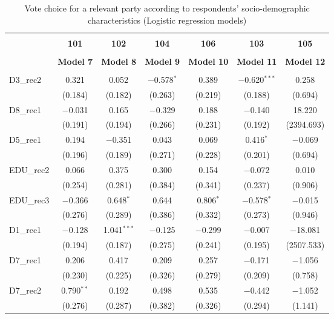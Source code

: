 \documentclass[
]{article}
\begin{document}
\begin{table}[!htbp] \centering 
  \caption{Vote choice for a relevant party according to respondents' 
                       socio-demographic characteristics (Logistic regression models)} 
  \label{table:full_logit_at} 
\begin{tabular}{@{\extracolsep{5pt}}lcccccc} 
\\[-1.8ex]\hline \\[-1.8ex] 
 & \textbf{101} & \textbf{102} & \textbf{104} & \textbf{106} & \textbf{103} & \textbf{105} \\ 
\\[-1.8ex] & \textbf{Model 7} & \textbf{Model 8} & \textbf{Model 9} & \textbf{Model 10} & \textbf{Model 11} & \textbf{Model 12}\\ 
\hline \\[-1.8ex] 
 D3\_rec2 & 0.321 & 0.052 & $-$0.578$^{*}$ & 0.389 & $-$0.620$^{***}$ & 0.258 \\ 
  & (0.184) & (0.182) & (0.263) & (0.219) & (0.188) & (0.694) \\ 
  D8\_rec1 & $-$0.031 & 0.165 & $-$0.329 & 0.188 & $-$0.140 & 18.220 \\ 
  & (0.191) & (0.194) & (0.266) & (0.231) & (0.192) & (2394.693) \\ 
  D5\_rec1 & 0.194 & $-$0.351 & 0.043 & 0.069 & 0.416$^{*}$ & $-$0.069 \\ 
  & (0.196) & (0.189) & (0.271) & (0.228) & (0.201) & (0.694) \\ 
  EDU\_rec2 & 0.066 & 0.375 & 0.300 & 0.154 & $-$0.072 & 0.010 \\ 
  & (0.254) & (0.281) & (0.384) & (0.341) & (0.237) & (0.906) \\ 
  EDU\_rec3 & $-$0.366 & 0.648$^{*}$ & 0.644 & 0.806$^{*}$ & $-$0.578$^{*}$ & $-$0.015 \\ 
  & (0.276) & (0.289) & (0.386) & (0.332) & (0.273) & (0.946) \\ 
  D1\_rec1 & $-$0.128 & 1.041$^{***}$ & $-$0.125 & $-$0.299 & $-$0.007 & $-$18.081 \\ 
  & (0.194) & (0.187) & (0.275) & (0.241) & (0.195) & (2507.533) \\ 
  D7\_rec1 & 0.206 & 0.417 & 0.209 & 0.257 & $-$0.171 & $-$1.056 \\ 
  & (0.230) & (0.225) & (0.326) & (0.279) & (0.209) & (0.758) \\ 
  D7\_rec2 & 0.790$^{**}$ & 0.192 & 0.498 & 0.535 & $-$0.442 & $-$1.052 \\ 
  & (0.276) & (0.287) & (0.382) & (0.326) & (0.294) & (1.141) \\ 

\end{tabular}
\end{table}
\end{document}
